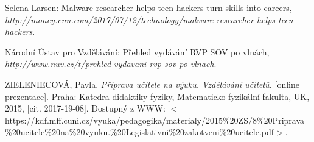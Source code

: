 \documentclass[a4paper, 12pt]{article}
\begin{document}
\newpage
\begin{thebibliography}{9}

    Selena Larsen: Malware researcher helps teen hackers turn skills into careers,
    \\\textit{http://money.cnn.com/2017/07/12/technology/malware-researcher-helps-teen-hackers}.

    Národní Ústav pro Vzdělávání: Přehled vydávání RVP SOV po vlnách,
    \\\textit{http://www.nuv.cz/t/prehled-vydavani-rvp-sov-po-vlnach}.

    ZIELENIECOVÁ, Pavla. \textit{Příprava učitele na výuku. Vzdělávání učitelů.} [online prezentace]. Praha: Katedra didaktiky fyziky, Matematicko-fyzikální fakulta, UK, 2015, [cit. 2017-19-08]. Dostupný z WWW: $<$https://kdf.mff.cuni.cz/vyuka/pedagogika/materialy/2015\%20ZS/8\%20Priprava\\\%20ucitele\%20na\%20vyuku.\%20Legislativni\%20zakotveni\%20ucitele.pdf$>$.

\end{thebibliography}
\end{document}
